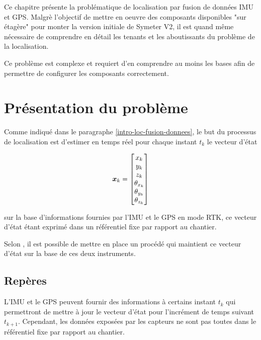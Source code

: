 \documentclass[12pt,a4paper]{report}
\begin{document}
Ce chapitre présente la problématique de localisation par fusion de données IMU et GPS. Malgrè l'objectif de mettre en oeuvre des composants disponibles "sur étagère" pour monter la version initiale de Symeter V2, il est quand même nécessaire de comprendre en détail les tenants et les aboutissants du problème de la localisation.

\para Ce problème est complexe et requiert d'en comprendre au moins les bases afin de permettre de configurer les composants correctement.

	\section{Présentation du problème}
	Comme indiqué dans le paragraphe \ref{intro-loc-fusion-donnees}, le but du processus de localisation est d'estimer en temps réel pour chaque instant $t_k$ le vecteur d'état 
	
	\begin{equation}	
	\boldsymbol{x}_k = \begin{bmatrix}
	x_k \\ y_k \\ z_k \\ \theta_{x_k} \\ \theta_{y_k} \\ \theta_{z_k}
	\end{bmatrix}
	\end{equation}
	\newline
	
	sur la base d'informations fournies par l'IMU et le GPS en mode RTK, ce vecteur d'état étant exprimé dans un référentiel fixe par rapport au chantier.
	
	
	\para Selon \cite{gustavsson_uav_2015}, il est possible de mettre en place un procédé qui maintient ce vecteur d'état sur la base de ces deux instruments.
	
	\subsection{Repères}
	
	\para L'IMU et le GPS peuvent fournir des informations à certains instant $t_k$ qui permettront de mettre à jour le vecteur d'état pour l'incrément de temps suivant $t_{k+1}$. Cependant, les données exposées par les capteurs ne sont pas toutes dans le référentiel fixe par rapport au chantier.
	
\end{document}
